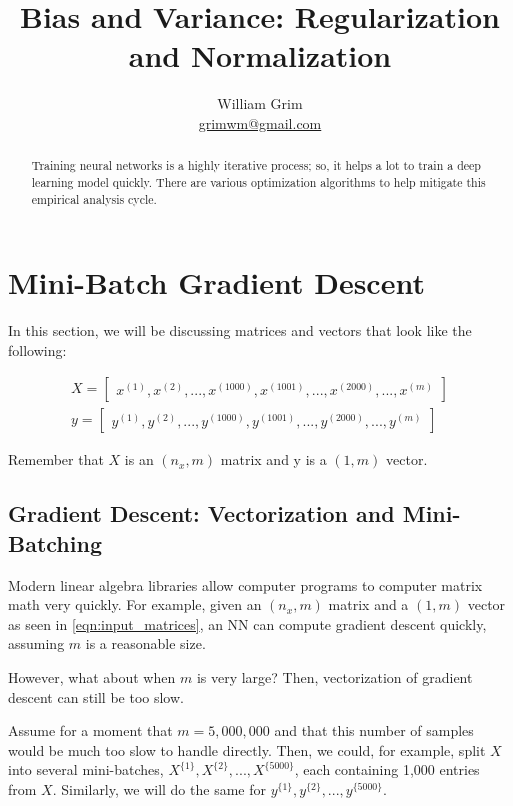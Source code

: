\documentclass{article}
\begin{document}
\title {Bias and Variance: Regularization and Normalization}
\author{William Grim \\ \href{mailto:grimwm@gmail.com}{grimwm@gmail.com}}

\maketitle

\begin{abstract}
Training neural networks is a highly iterative process; so, it helps a lot to train a deep learning model quickly.  There are various optimization algorithms to help mitigate this empirical analysis cycle.
\end{abstract}

\section{Mini-Batch Gradient Descent}

In this section, we will be discussing matrices and vectors that look like the following:

\begin{gather}
\label{eqn:input_matrices}
X = \begin{bmatrix}
x^{(1)}, x^{(2)}, ..., x^{(1000)}, x^{(1001)}, ..., x^{(2000)}, ..., x^{(m)}
\end{bmatrix}\\
%
y = \begin{bmatrix}
y^{(1)}, y^{(2)}, ..., y^{(1000)}, y^{(1001)}, ..., y^{(2000)}, ..., y^{(m)}
\end{bmatrix}
\end{gather}

Remember that $X$ is an $(n_x, m)$ matrix and y is a $(1, m)$ vector.

\subsection{Gradient Descent: Vectorization and Mini-Batching}

Modern linear algebra libraries allow computer programs to computer matrix math very quickly.  For example, given an $(n_x, m)$ matrix and a $(1, m)$ vector as seen in \ref{eqn:input_matrices}, an NN can compute gradient descent quickly, assuming $m$ is a reasonable size.

However, what about when $m$ is very large?  Then, vectorization of gradient descent can still be too slow.

Assume for a moment that $m = 5,000,000$ and that this number of samples would be much too slow to handle directly.  Then, we could, for example, split $X$ into several mini-batches, $X^{\{1\}}, X^{\{2\}}, ..., X^{\{5000\}}$, each containing 1,000 entries from $X$.  Similarly, we will do the same for $y^{\{1\}}, y^{\{2\}}, ..., y^{\{5000\}}$.
\end{document}
